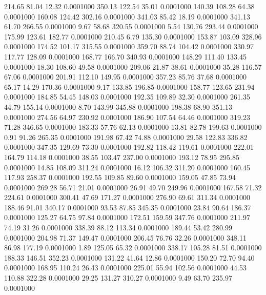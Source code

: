  214.65   81.04   12.32   0.0001000
 350.13  122.54   35.01   0.0001000
 140.39  108.28   64.38   0.0001000
 160.08  124.42  302.16   0.0001000
 341.03   85.42   18.19   0.0001000
 341.13   61.70  266.55   0.0001000
   9.67   58.68  320.55   0.0001000
   5.54  130.76  293.44   0.0001000
 175.99  123.61  182.77   0.0001000
 210.45    6.79  135.30   0.0001000
 153.87  103.09  328.96   0.0001000
 174.52  101.17  315.55   0.0001000
 359.70   88.74  104.42   0.0001000
 330.97  117.77  128.09   0.0001000
 168.77  166.70  340.93   0.0001000
 148.29  111.40  133.45   0.0001000
  18.30  108.60   49.58   0.0001000
 209.06   21.87   38.61   0.0001000
  35.28  116.57   67.06   0.0001000
 201.91  112.10  149.95   0.0001000
 357.23   85.76   37.68   0.0001000
  65.17   14.29  170.36   0.0001000
   9.17  133.85  196.85   0.0001000
 158.77  123.65  231.94   0.0001000
 184.85   54.45  148.03   0.0001000
 192.35  109.89   32.30   0.0001000
 261.35   44.79  155.14   0.0001000
   8.70  143.99  345.88   0.0001000
 198.38   68.90  351.13   0.0001000
 274.56   64.97  230.92   0.0001000
 186.90  107.54   64.46   0.0001000
 319.23   71.28  346.65   0.0001000
 183.33   57.76   62.13   0.0001000
  13.81   82.78  199.63   0.0001000
   0.91   91.26  265.35   0.0001000
 191.98   67.42   74.88   0.0001000
  29.58  122.83  336.82   0.0001000
 347.35  129.69   73.30   0.0001000
 192.82  118.42  119.61   0.0001000
 222.01  164.79  114.18   0.0001000
  38.55  103.47  237.00   0.0001000
 193.12   78.95  295.85   0.0001000
  14.85  108.09  311.24   0.0001000
  16.12  106.32  311.20   0.0001000
 160.45  117.93  258.37   0.0001000
 192.55  109.85   89.60   0.0001000
 159.05   47.85   73.94   0.0001000
 269.28   56.71   21.01   0.0001000
  26.91   49.70  249.96   0.0001000
 167.58   71.32  224.61   0.0001000
 300.41   47.69  171.27   0.0001000
 276.90   69.61  311.34   0.0001000
 188.46   91.01  340.17   0.0001000
  93.53   87.85  345.35   0.0001000
  23.84   90.64  186.37   0.0001000
 125.27   64.75   97.84   0.0001000
 172.51  159.59  347.76   0.0001000
 211.97   74.19   31.26   0.0001000
 338.39   88.12  113.34   0.0001000
 189.44   53.42  280.99   0.0001000
 204.98   71.37  149.47   0.0001000
 206.45   76.76   32.26   0.0001000
 348.11   86.98  177.19   0.0001000
   1.89  125.05   65.32   0.0001000
 338.17  105.28   81.51   0.0001000
 188.33  146.51  352.23   0.0001000
 131.22   41.64   12.86   0.0001000
 150.20   72.70   94.40   0.0001000
 168.95  110.24   26.43   0.0001000
 225.01   55.94  102.56   0.0001000
  44.53  110.88  322.28   0.0001000
  29.25  131.27  310.27   0.0001000
   9.49   63.70  235.97   0.0001000
